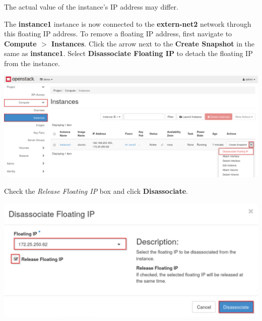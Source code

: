 \documentclass[letterpaper, 12pt]{article}
\begin{document}
\begin{enumerate}
    \begin{notebox}
        The actual value of the instance's IP address may differ.
    \end{notebox}

    \begin{labstep}
        The \textbf{instance1} instance is now connected to the \textbf{extern-net2} network through this floating IP address.
        To remove a floating IP address, first navigate to \textbf{Compute $>$ Instances}.
        Click the arrow next to the \textbf{Create Snapshot} in the same as \textbf{instance1}.
        Select \textbf{Disassociate Floating IP} to detach the floating IP from the instance.

        \begin{center}
            \includegraphics[width=\linewidth]{images/part3/step8.png}
        \end{center}
    \end{labstep}

    \begin{labstep}
        Check the \textit{Release Floating IP} box and click \textbf{Disassociate}.

        \begin{center}
            \includegraphics[width=\linewidth]{images/part3/step9.png}
        \end{center}
    \end{labstep}


\end{enumerate}
\end{document}
